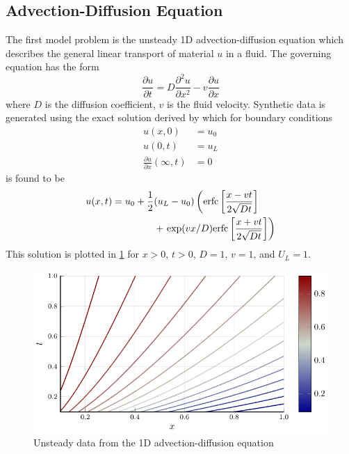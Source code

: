 \documentclass{article}
\begin{document}
\subsection{Advection-Diffusion Equation}

The first model problem is the unsteady 1D advection-diffusion equation which describes the general linear transport of material $u$ in a fluid. The governing equation has the form 
\begin{equation} 
\frac{\partial u}{\partial t} = D\frac{\partial^2 u}{\partial x^2} - v \frac{\partial u}{\partial x}
\end{equation}
where $D$ is the diffusion coefficient, $v$ is the fluid velocity. Synthetic data is generated using the exact solution derived by \cite{van1982analytical} which for boundary conditions 
\begin{align}
  u(x,0) &= u_0 \\
  u(0,t) &= u_L \\
  \frac{\partial u}{\partial x}(\infty, t) &= 0
\end{align}
is found to be 
\begin{equation}
  \begin{split}
  u(x,t) = u_0 + \frac{1}{2}&(u_L - u_0) \left({\rm erfc}\left[ \frac{x - vt}{2\sqrt{Dt}}\right]\right. \\
  &+ \left.{\rm exp}(vx/D) {\rm erfc}\left[ \frac{x + vt}{2\sqrt{Dt}}\right] \right)
  \end{split}
\end{equation}
This solution is plotted in \cref{fig:advdif} for $x>0$, $t>0$, $D=1$, $v=1$, and $U_L = 1$.

\begin{figure}
\vskip 0.2in
\begin{center}
\centerline{\includegraphics[width=\columnwidth]{./figures/advdif}}
\caption{Unsteady data from the 1D advection-diffusion equation}
\label{fig:advdif}
\end{center}
\vskip -0.2in
\end{figure}
\end{document}
